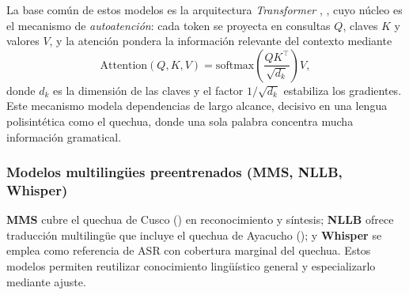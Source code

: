 \begin{bloqueNuevo}
\noindent La base com{\'u}n de estos modelos es la arquitectura \emph{Transformer}
\parencite{vaswani2017attention}, , cuyo n{\'u}cleo es el mecanismo de \emph{autoatenci{\'o}n}: cada
token se proyecta en consultas $Q$, claves $K$ y valores $V$, y la atenci{\'o}n pondera la
informaci{\'o}n relevante del contexto mediante
\begin{equation}
\mathrm{Attention}(Q,K,V) = \mathrm{softmax}\!\left(\frac{QK^{\top}}{\sqrt{d_k}}\right)V,
\label{eq:atencion}
\end{equation}
donde $d_k$ es la dimensi{\'o}n de las claves y el factor $1/\sqrt{d_k}$ estabiliza los gradientes.
Este mecanismo modela dependencias de largo alcance, decisivo en una lengua polisint{\'e}tica como el
quechua, donde una sola palabra concentra mucha informaci{\'o}n gramatical.

\end{bloqueNuevo}

\subsubsection{Modelos multiling{\"u}es preentrenados (MMS, NLLB, Whisper)}
\textbf{MMS} \parencite{pratap2024mms} cubre el quechua de Cusco () en reconocimiento y
s{\'i}ntesis; \textbf{NLLB} \parencite{costajussa2022nllb} ofrece traducci{\'o}n multiling{\"u}e que
incluye el quechua de Ayacucho (); y \textbf{Whisper} \parencite{radford2023whisper} se
emplea como referencia de ASR con cobertura marginal del quechua. Estos modelos permiten reutilizar
conocimiento ling{\"u}{\'i}stico general y especializarlo mediante ajuste.


